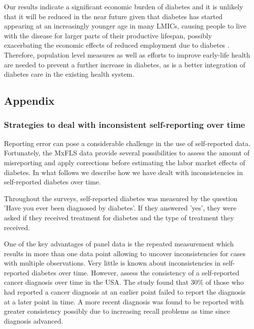 \documentclass[12pt,english]{article}
\begin{document}
Our results indicate a significant economic burden of diabetes and it is unlikely that it will be reduced in the near future given that diabetes has started appearing at an increasingly younger age in many \ac{LMICs}, causing people to live with the disease for larger parts of their productive lifespan, possibly exacerbating the economic effects of reduced employment due to diabetes \parencite{Hu2011,Villalpando2010}. Therefore, population level measures as well as efforts to improve early-life health are needed to prevent a further increase in diabetes, as is a better integration of diabetes care in the existing health system.

\begin{appendix}
\clearpage


\part*{\label{part:Appendix}Appendix}

\section{\label{sec:Appendix}Strategies to deal with inconsistent self-reporting over time}

Reporting error can pose a considerable challenge in the use of self-reported data. Fortunately, the \ac{MxFLS} data provide several possibilities to assess the amount of misreporting and apply corrections before estimating the labor market effects of diabetes. In what follows we describe how we have dealt with inconsistencies in self-reported diabetes over time.

Throughout the surveys, self-reported diabetes was measured by the question 'Have you ever been diagnosed by diabetes'. If they answered 'yes', they were asked if they received treatment for diabetes and the type of treatment they received.

One of the key advantages of panel data is the repeated measurement which results in more than one data point allowing to uncover inconsistencies for cases with multiple observations. Very little is known about inconsistencies in self-reported diabetes over time. However, \textcite{Zajacova2010} assess the consistency of a self-reported cancer diagnosis over time in the USA. The study found that 30\% of those who had reported a cancer diagnosis at an earlier point failed to report the diagnosis at a later point in time. A more recent diagnosis was found to be reported with greater consistency possibly due to increasing recall problems as time since diagnosis advanced.


\end{appendix}
\end{document}
